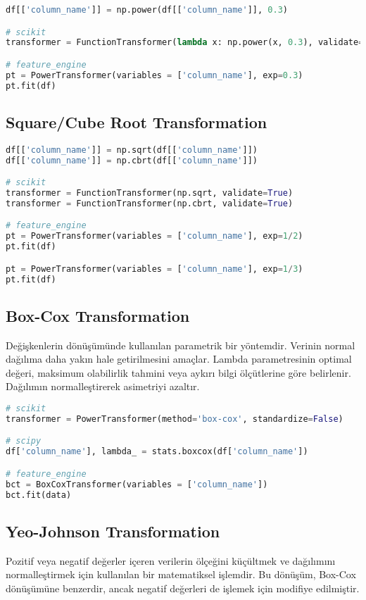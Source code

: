 \begin{lstlisting}[language=Python]
df[['column_name']] = np.power(df[['column_name']], 0.3)

# scikit
transformer = FunctionTransformer(lambda x: np.power(x, 0.3), validate=True)

# feature_engine
pt = PowerTransformer(variables = ['column_name'], exp=0.3)
pt.fit(df)
\end{lstlisting}

\subsection{Square/Cube Root Transformation}

\begin{lstlisting}[language=Python]
df[['column_name']] = np.sqrt(df[['column_name']])
df[['column_name']] = np.cbrt(df[['column_name']])

# scikit
transformer = FunctionTransformer(np.sqrt, validate=True)
transformer = FunctionTransformer(np.cbrt, validate=True)

# feature_engine
pt = PowerTransformer(variables = ['column_name'], exp=1/2)
pt.fit(df)

pt = PowerTransformer(variables = ['column_name'], exp=1/3)
pt.fit(df)
\end{lstlisting}

\subsection{Box-Cox Transformation}
Değişkenlerin dönüşümünde kullanılan parametrik bir yöntemdir. Verinin normal dağılıma daha yakın hale getirilmesini amaçlar. Lambda parametresinin optimal değeri, maksimum olabilirlik tahmini veya aykırı bilgi ölçütlerine göre belirlenir. Dağılımın normalleştirerek asimetriyi azaltır.

\begin{lstlisting}[language=Python]
# scikit
transformer = PowerTransformer(method='box-cox', standardize=False)

# scipy
df['column_name'], lambda_ = stats.boxcox(df['column_name'])

# feature_engine
bct = BoxCoxTransformer(variables = ['column_name'])
bct.fit(data)
\end{lstlisting}

\subsection{Yeo-Johnson Transformation}
Pozitif veya negatif değerler içeren verilerin ölçeğini küçültmek ve dağılımını normalleştirmek için kullanılan bir matematiksel işlemdir. Bu dönüşüm, Box-Cox dönüşümüne benzerdir, ancak negatif değerleri de işlemek için modifiye edilmiştir.

